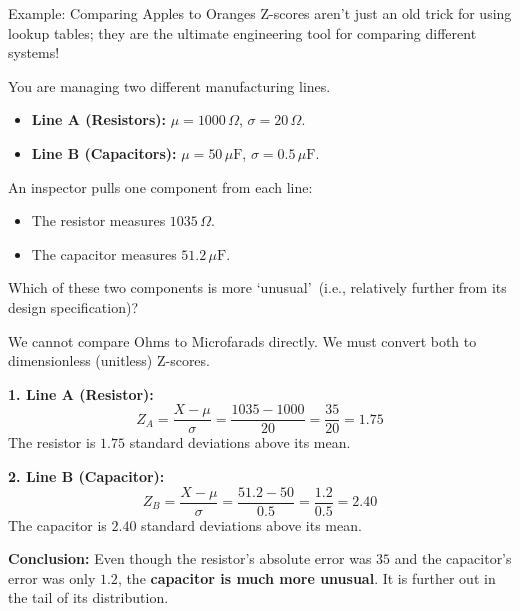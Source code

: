 \begin{frame}[allowframebreaks]{Example: Comparing Apples to Oranges}
    Z-scores aren't just an old trick for using lookup tables; they are the ultimate engineering tool for comparing different systems!

    \vspace{0.2cm}
\begin{example}
        You are managing two different manufacturing lines.
        \begin{itemize}
            \item \textbf{Line A (Resistors):} $\mu = 1000\,\Omega$, $\sigma = 20\,\Omega$.
            \item \textbf{Line B (Capacitors):} $\mu = 50\,\mu\text{F}$, $\sigma = 0.5\,\mu\text{F}$.
        \end{itemize}
        
        \vspace{0.2cm}
        An inspector pulls one component from each line:
        \begin{itemize}
            \item The resistor measures $1035\,\Omega$.
            \item The capacitor measures $51.2\,\mu\text{F}$.
        \end{itemize}
        
         Which of these two components is more \lq unusual\rq\ (i.e., relatively further from its design specification)?
    \end{example}
    \end{frame}
 
 \begin{frame}

    \begin{solution}
    	\small
        We cannot compare Ohms to Microfarads directly. We must convert both to dimensionless (unitless) Z-scores.
        
        \textbf{1. Line A (Resistor):}
        \[ Z_A = \frac{X - \mu}{\sigma} = \frac{1035 - 1000}{20} = \frac{35}{20} = \mathbf{1.75} \]
        The resistor is $1.75$ standard deviations above its mean.
        
        \textbf{2. Line B (Capacitor):}
        \[ Z_B = \frac{X - \mu}{\sigma} = \frac{51.2 - 50}{0.5} = \frac{1.2}{0.5} = \mathbf{2.40} \]
        The capacitor is $2.40$ standard deviations above its mean.
        
        \textbf{Conclusion:} Even though the resistor's absolute error was $35$ and the capacitor's error was only $1.2$, the \textbf{capacitor is much more unusual}. It is further out in the tail of its distribution.
    \end{solution}
\end{frame}

